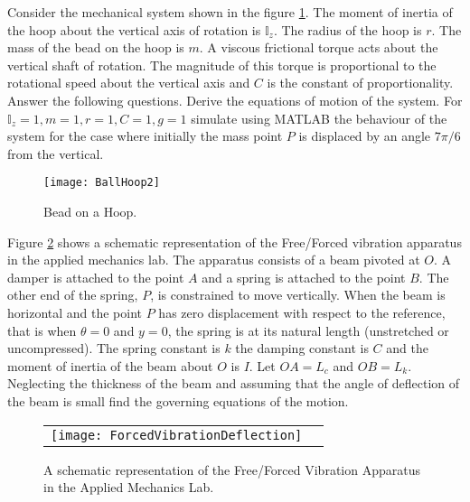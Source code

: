 \documentclass[graybox,envcountchap,sectrefs]{svmonoMuga}
\begin{document}
\begin{exercise}\label{ex:BeadOnHoop}
Consider the mechanical system shown in the figure \ref{Fig:BeadOnHoop}. The moment of inertia of the hoop about the vertical axis of rotation is $\mathbb{I}_z$. The radius of the hoop is $r$. 
The mass of the bead on the hoop is $m$. A viscous frictional torque acts about the vertical shaft of rotation. The magnitude of this torque is proportional to the rotational speed about 
the vertical axis and $C$ is the constant of proportionality. Answer the following questions.
Derive the equations of motion of the system.
For $\mathbb{I}_z=1, m=1,r=1,C=1, g=1$ simulate using MATLAB the behaviour of the system for the case where initially the mass point $P$ is displaced by an angle $7\pi/6$ from the vertical.
\begin{figure}[h]
\begin{center}
\texttt{[image: BallHoop2]}
\renewcommand{\baselinestretch}{1}\selectfont
\caption{Bead on a Hoop.}
\label{Fig:BeadOnHoop}
\renewcommand{\baselinestretch}{1.5}\selectfont
\end{center}
\end{figure}
\end{exercise}

\begin{exercise}\label{ex:FreeForcedVibrationP}
Figure \ref{Fig:ForcedVibrationApparatus} shows a schematic representation of the Free/Forced vibration apparatus in the applied mechanics lab. The apparatus consists of a beam 
pivoted at $O$. A damper is attached to the point $A$ and a spring is attached to the point $B$. The other end of the spring, $P$, is constrained to move vertically. When the beam is 
horizontal and the point $P$ has zero displacement with respect to the reference, that is when $\theta=0$ and $y=0$, the spring is at its natural length (unstretched or 
uncompressed). The spring constant is $k$ the damping constant is $C$ and the moment of inertia of the beam about $O$ is $I$. Let $OA=L_c$ and $OB=L_k$. Neglecting the 
thickness of the beam and assuming that the angle of deflection of the beam is small find the governing equations of the motion.
\begin{figure}[ht]
\begin{center}
\begin{tabular}{cc}
\texttt{[image: ForcedVibrationDeflection]}
\end{tabular}
\caption{A schematic representation of the Free/Forced Vibration Apparatus in the Applied Mechanics Lab.} \label{Fig:ForcedVibrationApparatus}
\end{center}
\end{figure}
\end{exercise}
\end{document}
